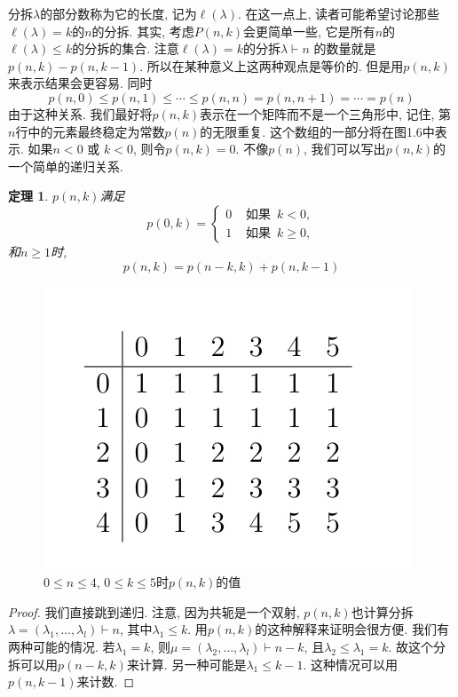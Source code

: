\documentclass{ctexbook}
\newtheorem{thm}{定理}[section]
\begin{document}
分拆$\lambda$的部分数称为它的长度, 记为$\ell(\lambda)$. 在这一点上, 读者可能希望讨论那些$\ell(\lambda)=k$的$n$的分拆.
其实, 考虑$P(n, k)$会更简单一些, 它是所有$n$的$\ell(\lambda) \leqslant k$的分拆的集合. 注意$\ell(\lambda)=k$的分拆$\lambda \vdash n$
的数量就是$p(n, k)-p(n, k-1)$. 所以在某种意义上这两种观点是等价的. 但是用$p(n, k)$来表示结果会更容易. 同时
$$
p(n, 0) \leqslant p(n, 1) \leqslant \cdots \leqslant p(n, n)=p(n, n+1)=\cdots=p(n)
$$
由于这种关系. 我们最好将$p(n, k)$表示在一个矩阵而不是一个三角形中, 记住, 第$n$行中的元素最终稳定为常数$p(n)$的无限重复.
这个数组的一部分将在图1.6中表示. 如果$n<0$ 或 $k<0$, 则令$p(n, k)=0$. 不像$p(n)$,  我们可以写出$p(n, k)$的一个简单的递归关系.
      \begin{thm}
     	$p(n, k)$满足
     	$$
     	p(0, k)=\left\{\begin{array}{ll}
     	0 & \text { 如果  }\,  k<0, \\
     	1 & \text { 如果  }\, k \geqslant 0,
     	\end{array}\right.
     	$$
     	和$n \geqslant 1$时,
     	$$
     	p(n, k)=p(n-k, k)+p(n, k-1)
     	$$
     \end{thm}

\begin{figure}
    \centering
    \includegraphics[scale=0.3]{./fig1/figure1.6.jpg}
    \caption{$0 \leqslant n \leqslant 4$, $0 \leqslant k \leqslant 5$时$p(n, k)$的值}
\end{figure}

    \begin{proof}
   我们直接跳到递归. 注意, 因为共轭是一个双射, $p(n, k)$也计算分拆$\lambda=\left(\lambda_{1}, \ldots, \lambda_{l}\right) \vdash n$, 其中$\lambda_{1} \leqslant k $.
   用$p(n, k)$的这种解释来证明会很方便. 我们有两种可能的情况. 若$\lambda_{1}=k$, 则$\mu=\left(\lambda_{2}, \ldots, \lambda_{l}\right) \vdash n-k$,
   且$\lambda_{2} \leqslant \lambda_{1}=k$. 故这个分拆可以用$p(n-k, k)$来计算. 另一种可能是$\lambda_{1} \leqslant k-1$. 这种情况可以用$p(n, k-1)$来计数.
   \end{proof}
\end{document}

